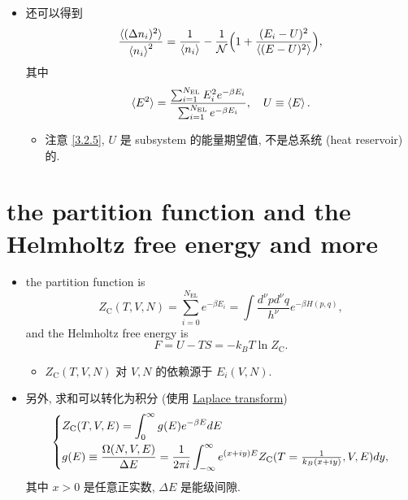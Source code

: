 \begin{itemize}
	\item 还可以得到
	\begin{equation}
		\frac{\braket{(\Delta n_i)^2}}{\braket{n_i}^2} = \frac{1}{\braket{n_i}} - \frac{1}{\mathcal{N}} \Big( 1 + \frac{(E_i - U)^2}{\braket{(E - U)^2}} \Big),
	\end{equation}
	其中
	\begin{equation}
		\braket{E^2} = \frac{\sum_{i = 1}^{N_\text{EL}} E_i^2 e^{- \beta E_i}}{\sum_{i = 1}^{N_\text{EL}} e^{- \beta E_i}}, \quad U \equiv \braket{E}.
	\end{equation}
	\begin{itemize}
		\item 注意 \eqref{3.2.5}, $U$ 是 subsystem 的能量期望值, 不是总系统 (heat reservoir) 的.
	\end{itemize}
\end{itemize}

\section{the partition function and the Helmholtz free energy and more}
\begin{itemize}
	\item the partition function is
	\begin{equation}
		Z_\text{C}(T, V, N) = \sum_{i = 0}^{N_\text{EL}} e^{- \beta E_i} = \int \frac{d^\nu p d^\nu q}{h^\nu} e^{- \beta H(p, q)},
	\end{equation}
	and the Helmholtz free energy is
	\begin{equation}
		F = U - T S = - k_B T \ln Z_\text{C}.
	\end{equation}
	\begin{itemize}
		\item $Z_\text{C}(T, V, N)$ 对 $V, N$ 的依赖源于 $E_i(V, N)$.
	\end{itemize}
	
	\item 另外, 求和可以转化为积分 (使用 \href{https://en.wikipedia.org/wiki/Laplace_transform#Inverse_Laplace_transform}{Laplace transform})
	\begin{equation}
		\begin{dcases}
			Z_\text{C}(T, V, E) = \int_0^\infty g(E) e^{- \beta E} dE \\
			g(E) \equiv \frac{\Omega(N, V, E)}{\Delta E} = \frac{1}{2 \pi i} \int_{- \infty}^\infty e^{(x + i y) E} Z_\text{C}(T = {\textstyle \frac{1}{k_B (x + i y)}}, V, E) dy,
		\end{dcases}
	\end{equation}
	其中 $x > 0$ 是任意正实数, $\Delta E$ 是能级间隙. 
\end{itemize}


